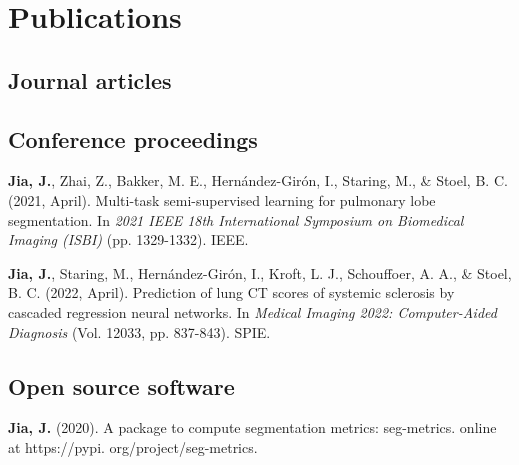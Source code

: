 \chapter{Publications}

\section*{Journal articles}



\section*{Conference proceedings}

\noindent
\textbf{Jia, J.}, Zhai, Z., Bakker, M. E., Hernández-Girón, I., Staring, M., \& Stoel, B. C. (2021, April). Multi-task semi-supervised learning for pulmonary lobe segmentation. In \textit{2021 IEEE 18th International Symposium on Biomedical Imaging (ISBI) }(pp. 1329-1332). IEEE.

\bigskip
\noindent
\textbf{Jia, J.}, Staring, M., Hernández-Girón, I., Kroft, L. J., Schouffoer, A. A., \& Stoel, B. C. (2022, April). Prediction of lung CT scores of systemic sclerosis by cascaded regression neural networks. In \textit{Medical Imaging 2022: Computer-Aided Diagnosis }(Vol. 12033, pp. 837-843). SPIE.

\section*{Open source software}
\noindent
\textbf{Jia, J.} (2020). A package to compute segmentation metrics: seg-metrics. online at https://pypi. org/project/seg-metrics.